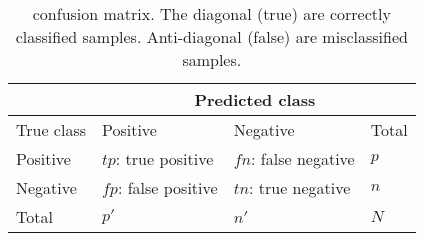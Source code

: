 \begin{table}[ht]
    \centering
    \begin{tabular}{ |l|l|l|l| }\hline
                    &   \multicolumn{3}{c|}{Predicted class}\\\hline
        True class  &  Positive             & Negative              & Total \\\hline
        Positive    & $tp$: true positive   & $fn$: false negative  & $p$   \\
        Negative    & $fp$: false positive  & $tn$: true negative   & $n$   \\\hline
        Total       & $p'$                  & $n'$                  & $N$   \\\hline
    \end{tabular}
    \caption{confusion matrix. The diagonal (true) are correctly classified samples. Anti-diagonal (false) are misclassified samples.}
    \label{tab:confmat}
\end{table}